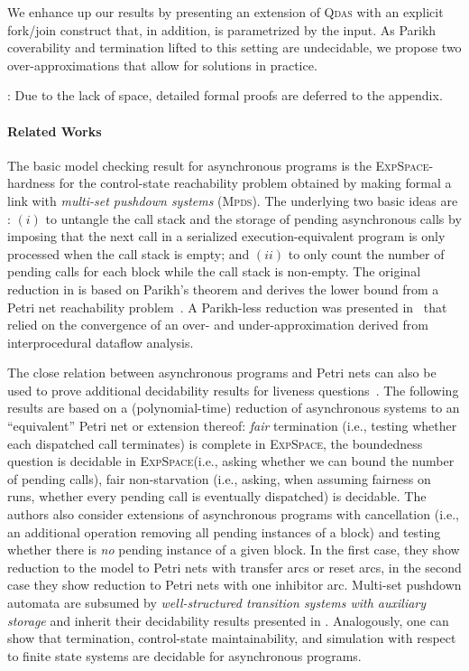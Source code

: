 \documentclass[runningheads,oribibl,]{article}
\newcommand{\mpds}{\textsc{Mpds}\xspace}
\newcommand{\qdas}{\textsc{Qdas}\xspace}
\newcommand{\dexpspace}{\textsc{ExpSpace}\xspace}
\begin{document}
We enhance up our results by presenting an extension of \qdas with an
explicit fork/join construct that, in addition, is parametrized by the
input. As Parikh coverability and termination lifted to this setting
are undecidable, we propose two over-approximations that allow for
solutions in practice.

\medskip
{}: Due to the lack of space, detailed formal
proofs are deferred to the appendix.



\paragraph{{\bf Related Works}}
The basic model checking result for asynchronous programs is the
\dexpspace-hardness for the control-state reachability problem
obtained by making formal a link with \emph{multi-set pushdown
systems} (\mpds). The underlying two basic ideas are : $(i)$ to
untangle the call stack and the storage of pending asynchronous calls
by imposing that the next call in a serialized execution-equivalent
program is only processed when the call stack is empty; and $(ii)$ to
only count the number of pending calls for each block while the call
stack is non-empty. The original reduction in \cite{sen-k-2006-300-a}
is based on Parikh's theorem and derives the lower bound from a Petri
net reachability problem~\cite{esparza-j-1998-374-a}.  A Parikh-less
reduction was presented in~\cite{jhala-r-2007-339-a} that relied on
the convergence of an over- and under-approximation derived from
interprocedural dataflow analysis.

The close relation between asynchronous programs and Petri nets can also be used
to prove additional decidability results for
liveness questions~\cite{ganty-p-2009-102-a,ganty-p-2010--a}. The following results are based on a (polynomial-time)
reduction of asynchronous systems to an ``equivalent'' Petri net or extension
thereof: \emph{fair} termination (i.e., testing whether each dispatched call
terminates) is complete in \dexpspace, the
boundedness question is decidable in \dexpspace (i.e., asking whether we can
bound the number of pending calls), fair non-starvation (i.e., asking, when
assuming fairness on runs, whether every pending call is eventually dispatched)
is decidable.
The authors also consider extensions of asynchronous programs with cancellation
(i.e., an additional operation removing all pending instances of a block) and
testing whether there is \emph{no} pending instance of a given block. In the
first case, they show reduction to the model to Petri nets with transfer arcs or
reset arcs, in the second case they show reduction to Petri nets with one
inhibitor arc.
Multi-set pushdown automata are subsumed by \emph{well-structured
  transition systems with auxiliary storage} and inherit their
decidability results presented in
\cite{chadha-r-2007-136-a,chadha-r-2009-4169-a}.
Analogously, one can show that
termination, control-state maintainability, and simulation with
respect to finite state systems are decidable for asynchronous
programs.
\end{document}
